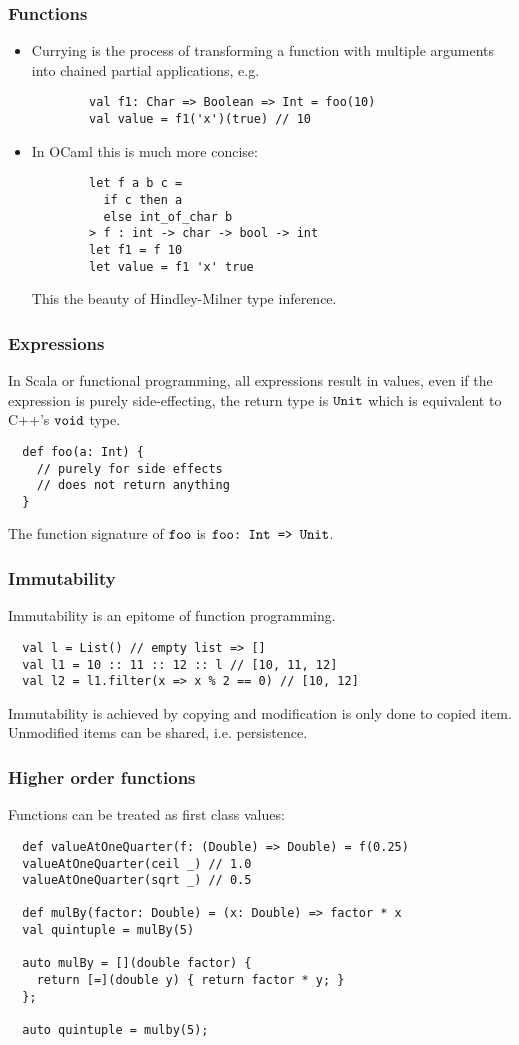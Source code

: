 \documentclass[handout]{beamer}
\begin{document}
\begin{frame}[fragile]
  \frametitle{Functions}
  \begin{itemize}
      \item Currying is the process of transforming a function with multiple arguments into chained partial applications, e.g.
      \begin{verbatim}
        val f1: Char => Boolean => Int = foo(10)
        val value = f1('x')(true) // 10
      \end{verbatim}
      \item In OCaml this is much more concise:
        \begin{verbatim}
        let f a b c =
          if c then a
          else int_of_char b
        > f : int -> char -> bool -> int
        let f1 = f 10
        let value = f1 'x' true
        \end{verbatim}
        This the beauty of Hindley-Milner type inference.
  \end{itemize}
\end{frame}

\begin{frame}[fragile]
  \frametitle{Expressions}
  In Scala or functional programming, all expressions result in values, even if the expression is purely side-effecting, the return type is $\verb|Unit|$ which is equivalent to C++'s $\verb|void|$ type.
  \begin{verbatim}
  def foo(a: Int) {
    // purely for side effects
    // does not return anything
  }
  \end{verbatim}
  The function signature of $\verb|foo|$ is $\verb|foo: Int => Unit|$.
\end{frame}

\begin{frame}[fragile]
  \frametitle{Immutability}
  Immutability is an epitome of function programming.
  \begin{verbatim}
  val l = List() // empty list => []
  val l1 = 10 :: 11 :: 12 :: l // [10, 11, 12] 
  val l2 = l1.filter(x => x % 2 == 0) // [10, 12]
  \end{verbatim}
  Immutability is achieved by copying and modification is only done to copied item. Unmodified items can be shared, i.e. persistence.
\end{frame}

\begin{frame}[fragile]
  \frametitle{Higher order functions}
  Functions can be treated as first class values:
  \begin{verbatim}
  def valueAtOneQuarter(f: (Double) => Double) = f(0.25)
  valueAtOneQuarter(ceil _) // 1.0
  valueAtOneQuarter(sqrt _) // 0.5

  def mulBy(factor: Double) = (x: Double) => factor * x
  val quintuple = mulBy(5)

  auto mulBy = [](double factor) {
    return [=](double y) { return factor * y; }
  };

  auto quintuple = mulby(5); 
  \end{verbatim}
\end{frame}
\end{document}
